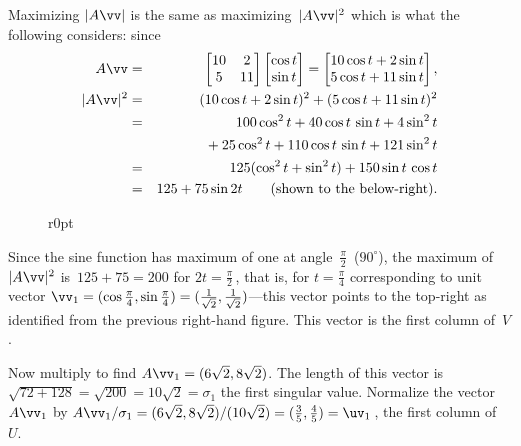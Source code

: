 \begin{example}
\begin{solution}
Maximizing \(|A\vv|\) is the same as maximizing~\(|A\vv|^2\) which is what the following considers: since
\begin{eqnarray*}
A\vv&=&\begin{bmatrix} 10&2\\5&11 \end{bmatrix}
\begin{bmatrix} \cos t\\\sin t \end{bmatrix}
=\begin{bmatrix} 10\cos t+2\sin t\\5\cos t+11\sin t \end{bmatrix},
\\|A\vv|^2&=&(10\cos t+2\sin t)^2+(5\cos t+11\sin t)^2
\\&=&100\cos^2 t+40\cos t\,\sin t+4\sin^2 t
\\&&{}+25\cos^2 t+110\cos t\,\sin t+121\sin^2 t
\\&=&125(\cos^2t+\sin^2t)+150\sin t\,\cos t
\\&=&125+75\sin 2t \qquad(\text{shown to the below-right}).
\end{eqnarray*}

\begin{wrapfigure}r{0pt}
\end{wrapfigure}
Since the sine function has maximum of one at angle~\(\frac\pi2\)~(\(90^\circ\)), the maximum of~\(|A\vv|^2\) is~\(125+75=200\) for \(2t=\frac\pi2\)\,, that is, for \(t=\frac\pi4\) corresponding to unit vector \(\vv_1=(\cos\frac\pi4,\sin\frac\pi4)=(\frac1{\sqrt2},\frac1{\sqrt2})\)---this vector points to the top-right as identified from the previous right-hand figure.
This vector is the first column of~\(V\).

Now multiply to find \(A\vv_1=(6\sqrt2,8\sqrt2)\).  
The length of this vector is \(\sqrt{72+128}=\sqrt{200}=10\sqrt 2=\sigma_1\) the first singular value.  
Normalize the vector~\(A\vv_1\) by \(A\vv_1/\sigma_1 =(6\sqrt2,8\sqrt2)/(10\sqrt2) =(\frac35,\frac45) =\uv_1\)\,, the first column of~\(U\).


\end{solution}
\end{example}
